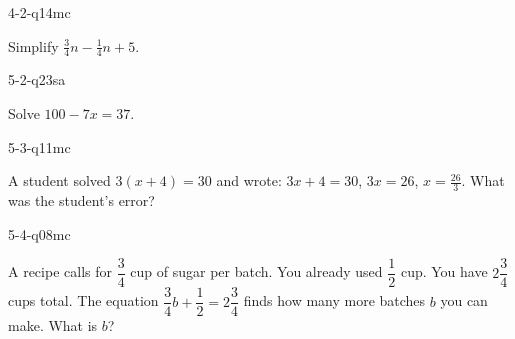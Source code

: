 \begin{practiceQuestion}{4-2-q14}{mc}
\begin{questionText}
Simplify $\frac{3}{4}n - \frac{1}{4}n + 5$.


\begin{center}
\hspace{1cm}
\end{center}
\end{questionText}
\end{practiceQuestion}

\begin{practiceQuestion}{5-2-q23}{sa}
\begin{questionText}
Solve $100 - 7x = 37$.
\end{questionText}
\end{practiceQuestion}

\begin{practiceQuestion}{5-3-q11}{mc}
\begin{questionText}
A student solved $3(x + 4) = 30$ and wrote: $3x + 4 = 30$, $3x = 26$, $x = \frac{26}{3}$. What was the student's error?
\end{questionText}
\end{practiceQuestion}

\begin{practiceQuestion}{5-4-q08}{mc}
\begin{questionText}
A recipe calls for $\dfrac{3}{4}$ cup of sugar per batch. You already used $\dfrac{1}{2}$ cup. You have $2\dfrac{3}{4}$ cups total. The equation $\dfrac{3}{4}b + \dfrac{1}{2} = 2\dfrac{3}{4}$ finds how many more batches $b$ you can make. What is $b$?
\end{questionText}
\end{practiceQuestion}


